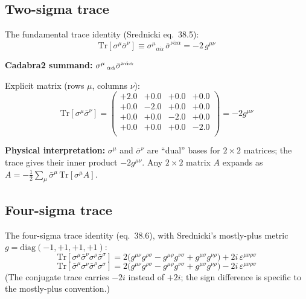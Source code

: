\subsection{Two-sigma trace}

The fundamental trace identity (Srednicki eq.~38.5):
\begin{equation}
  \boxed{
    \mathrm{Tr}[\sigma^\mu\bar\sigma^\nu]
    \equiv \sigma^\mu{}_{\alpha\dot\alpha}\,\bar\sigma^{\nu\dot\alpha\alpha}
    = -2\,g^{\mu\nu}
  }
  \tag{38.5}
\end{equation}

\textbf{Cadabra2 summand:} $\sigma^{\mu}\,_{\alpha \dot{\alpha}} \bar{\sigma}^{\nu \dot{\alpha} \alpha}$

Explicit matrix (rows $\mu$, columns $\nu$):
\[
  \mathrm{Tr}[\sigma^\mu\bar\sigma^\nu] =
  \begin{pmatrix}
  +2.0 & +0.0 & +0.0 & +0.0 \\
  +0.0 & -2.0 & +0.0 & +0.0 \\
  +0.0 & +0.0 & -2.0 & +0.0 \\
  +0.0 & +0.0 & +0.0 & -2.0 \\
  \end{pmatrix}
  = -2g^{\mu\nu}
\]



\medskip
\textbf{Physical interpretation:}
$\sigma^\mu$ and $\bar\sigma^\nu$ are ``dual'' bases for $2\times 2$ matrices;
the trace gives their inner product $-2g^{\mu\nu}$.  Any $2\times2$ matrix $A$
expands as $A = -\frac{1}{2}\sum_\mu \bar\sigma^\mu\,\mathrm{Tr}[\sigma^\mu A]$.

\subsection{Four-sigma trace}

The four-sigma trace identity (eq.~38.6), with Srednicki's
mostly-plus metric $g = \mathrm{diag}(-1,+1,+1,+1)$:
\begin{equation}
  \boxed{
    \mathrm{Tr}[\sigma^\mu\bar\sigma^\nu\sigma^\rho\bar\sigma^\sigma]
    = 2\bigl(g^{\mu\nu}g^{\rho\sigma} - g^{\mu\rho}g^{\nu\sigma}
          + g^{\mu\sigma}g^{\nu\rho}\bigr)
      + 2i\,\varepsilon^{\mu\nu\rho\sigma}
  }
  \tag{38.6}
\end{equation}
\begin{equation}
  \mathrm{Tr}[\bar\sigma^\mu\sigma^\nu\bar\sigma^\rho\sigma^\sigma]
  = 2\bigl(g^{\mu\nu}g^{\rho\sigma} - g^{\mu\rho}g^{\nu\sigma}
        + g^{\mu\sigma}g^{\nu\rho}\bigr)
    - 2i\,\varepsilon^{\mu\nu\rho\sigma}
  \tag{38.6$'$}
\end{equation}
(The conjugate trace carries $-2i$ instead of $+2i$; the sign difference
is specific to the mostly-plus convention.)

